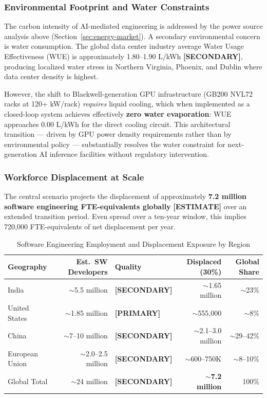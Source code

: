 \documentclass{article}
\newcommand{\PRIMARY}{\textbf{[PRIMARY]}}
\newcommand{\SECONDARY}{\textbf{[SECONDARY]}}
\newcommand{\ESTIMATE}{\textbf{[ESTIMATE]}}
\begin{document}
\subsubsection{Environmental Footprint and Water Constraints}

The carbon intensity of AI-mediated engineering is addressed by the power source analysis
above (Section~\ref{sec:energy-market}). A secondary environmental concern is water
consumption. The global data center industry average Water Usage Effectiveness (WUE) is
approximately 1.80--1.90 L/kWh \SECONDARY{}, producing localized water stress in Northern
Virginia, Phoenix, and Dublin where data center density is highest.

However, the shift to Blackwell-generation GPU infrastructure (GB200 NVL72 racks at 120+
kW/rack) \textit{requires} liquid cooling, which when implemented as a closed-loop system
achieves effectively \textbf{zero water evaporation}: WUE approaches 0.00 L/kWh for the
direct cooling circuit. This architectural transition --- driven by GPU power density
requirements rather than by environmental policy --- substantially resolves the water
constraint for next-generation AI inference facilities without regulatory intervention.

\subsubsection{Workforce Displacement at Scale}

The central scenario projects the displacement of approximately \textbf{7.2 million software
engineering FTE-equivalents globally} \ESTIMATE{} over an extended transition period. Even spread
over a ten-year window, this implies 720,000 FTE-equivalents of net displacement per year.

\begin{table}[ht]
\centering
\caption{Software Engineering Employment and Displacement Exposure by Region}
\label{tab:displacement}
\small
\begin{tabular}{@{}lrp{1.2cm}rr@{}}
\toprule
\textbf{Geography} & \textbf{Est.\ SW Developers} & \textbf{Quality} & \textbf{Displaced (30\%)} & \textbf{Global Share} \\
\midrule
India & $\sim$5.5 million & \SECONDARY{} & $\sim$1.65 million & $\sim$23\% \\
United States & $\sim$1.85 million & \PRIMARY{} & $\sim$555,000 & $\sim$8\% \\
China & $\sim$7--10 million & \SECONDARY{} & $\sim$2.1--3.0 million & $\sim$29--42\% \\
European Union & $\sim$2.0--2.5 million & \SECONDARY{} & $\sim$600--750K & $\sim$8--10\% \\
Global Total & $\sim$24 million & \SECONDARY{} & \textbf{$\sim$7.2 million} & 100\% \\
\bottomrule
\end{tabular}
\end{table}
\end{document}
